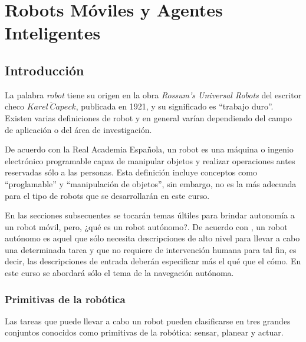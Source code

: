 \chapter{Robots Móviles y Agentes Inteligentes}


\section{Introducción}

La palabra \textit{robot} tiene su origen en la obra \textit{Rossum's Universal Robots} del escritor checo $Karel \,\check{C}apeck$, publicada en 1921, y su significado es ``trabajo duro''. Existen varias definiciones de robot y en general varían dependiendo del campo de aplicación o del área de investigación. 

De acuerdo con la Real Academia Española, un robot es una máquina o ingenio electrónico programable capaz de manipular objetos y realizar operaciones antes reservadas sólo a las personas. Esta definición incluye conceptos como ``proglamable'' y ``manipulación de objetos'', sin embargo, no es la más adecuada para el tipo de robots que se desarrollarán en este curso. 


En las secciones subsecuentes se tocarán temas últiles para brindar autonomía a un robot móvil, pero, ¿qué es un robot autónomo?. De acuerdo con \cite{Latombe1991MotionPlanning}, un robot autónomo es aquel que sólo necesita descripciones de alto nivel para llevar a cabo una determinada tarea y que no requiere de intervención humana para tal fin, es decir, las descripciones de entrada deberán especificar más el qué que el cómo. En este curso se abordará sólo el tema de la navegación autónoma. 

\subsection{Primitivas de la robótica}
Las tareas que puede llevar a cabo un robot pueden clasificarse en tres grandes conjuntos conocidos como primitivas de la robótica: sensar, planear y actuar. 

